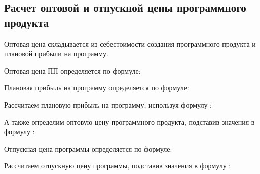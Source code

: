 \subsection{Расчет оптовой и отпускной цены программного продукта}
\label{sec:economics:ppoptcost}

Оптовая цена складывается из себестоимости создания программного продукта и плановой прибыли на программу.

Оптовая цена ПП определяется по формуле:
\ppOptPriceEquation

Плановая прибыль на программу определяется по формуле:
\plannedSoftIncomeEquation

Рассчитаем плановую прибыль на программу, используя формулу :
\plannedSoftIncomeFormulaApplied

А также определим оптовую цену программного продукта, подставив значения в формулу :
\ppOptPriceFormulaApplied

Отпускная цена программы определяется по формуле:
\ppResultCostEquation

Рассчитаем отпускную цену программы, подставив значения в формулу :
\ppResultCostFormulaApplied